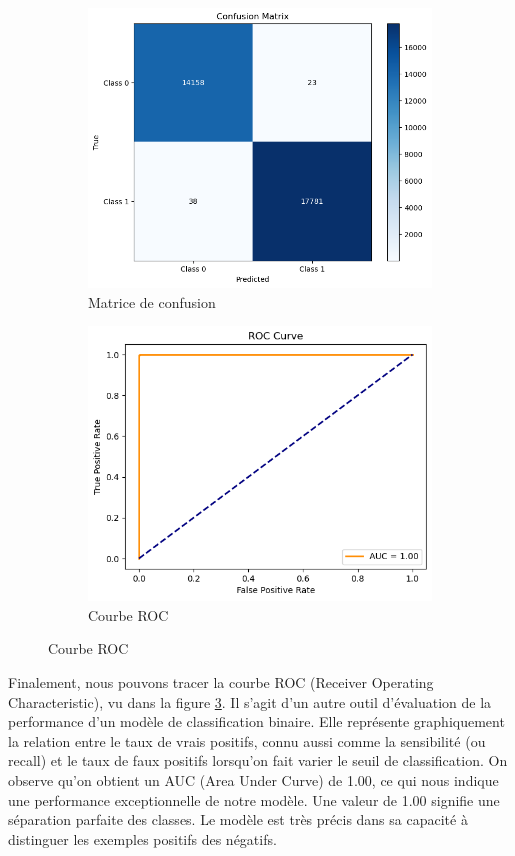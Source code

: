 \documentclass[11pt, parskip=half]{scrartcl} %
\begin{document}
\begin{figure}[h]
	\begin{subfigure}[c]{0.5\textwidth}
		\centering
		\includegraphics[width=0.9\linewidth]{./figures/matrix_CNN.png}
		\caption{Matrice de confusion}
		\label{fig:matrix_CNN}
	\end{subfigure}
	\begin{subfigure}[c]{0.5\textwidth}
		\centering
		\includegraphics[width=0.9\linewidth]{./figures/ROC.png}
		\caption{Courbe ROC}
		\label{fig:ROC}
	\end{subfigure}

\end{figure}

Finalement, nous pouvons tracer la courbe ROC (Receiver Operating Characteristic), vu dans la figure \ref{fig:ROC}. Il s’agit d’un autre outil d’évaluation de la performance d’un modèle de classification binaire. Elle représente graphiquement la relation entre le taux de vrais positifs, connu aussi comme la sensibilité (ou recall) et le taux de faux positifs lorsqu’on fait varier le seuil de classification. On observe qu’on obtient un AUC (Area Under Curve) de 1.00, ce qui nous indique une performance exceptionnelle de notre modèle. Une valeur de 1.00 signifie une séparation parfaite des classes. Le modèle est très précis dans sa capacité à distinguer les exemples positifs des négatifs.
\end{document}
